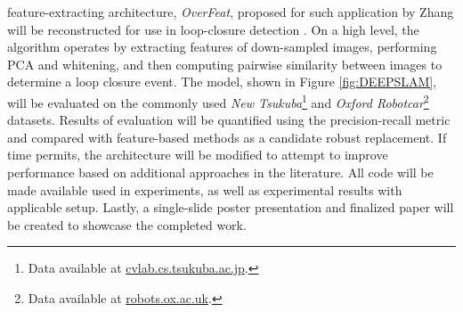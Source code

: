 \documentclass[10pt,twocolumn,letterpaper]{article}
\begin{document}
feature-extracting architecture, \textit{OverFeat}, proposed for such application by Zhang \etal will be reconstructed for use in loop-closure detection \cite{zhang_loop_2017}. On a high level, the 
algorithm operates by extracting features of down-sampled images, performing PCA and whitening, and then computing pairwise similarity between images to determine a loop closure event. The model, shown 
in Figure \ref{fig:DEEPSLAM}, will be evaluated on the commonly used \textit{New Tsukuba}\footnote{Data available at 
\hyperlink{http://www.cvlab.cs.tsukuba.ac.jp/dataset/tsukubastereo.php}{cvlab.cs.tsukuba.ac.jp}.} and \textit{Oxford Robotcar}\footnote{Data available at 
\hyperlink{http://www.robots.ox.ac.uk/~mobile/IJRR_2008_Dataset/}{robots.ox.ac.uk}.} datasets. Results of evaluation will be quantified using the precision-recall metric and compared with feature-based 
methods as a candidate robust replacement. If time permits, the architecture will be modified to attempt to improve performance based on additional approaches in the literature. All code will be made 
available used in experiments, as well as experimental results with applicable setup. Lastly, a single-slide poster presentation and finalized paper will be created to showcase the completed work.

\end{document}
